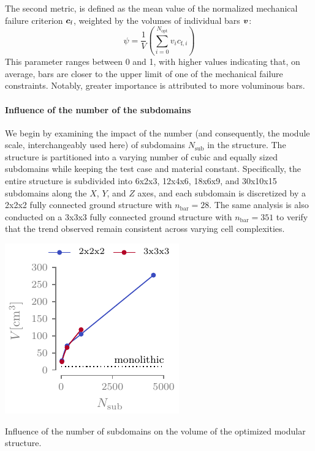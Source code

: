 The second metric, is defined as the mean value of the normalized mechanical failure criterion $\bm{c}_\text{f}$, weighted by the volumes of individual bars $\bm{v}$:
\begin{equation}
    \psi = \frac{1}{V} \left( \sum_{i=0}^{N_\text{opt}} v_i c_{\text{f},i} \right)
\end{equation}
This parameter ranges between 0 and 1, with higher values indicating that, on average, bars are closer to the upper limit of one of the mechanical failure constraints. Notably, greater importance is attributed to more voluminous bars.

\paragraph{Influence of the number of the subdomains}
We begin by examining the impact of the number (and consequently, the module scale, interchangeably used here) of subdomains $N_\text{sub}$ in the structure. The structure is partitioned into a varying number of cubic and equally sized subdomains while keeping the test case and material constant. Specifically, the entire structure is subdivided into 6x2x3, 12x4x6, 18x6x9, and 30x10x15 subdomains along the $X$, $Y$, and $Z$ axes, and each subdomain is discretized by a 2x2x2 fully connected ground structure with $n_{\text{bar}} = 28$. The same analysis is also conducted on a 3x3x3 fully connected ground structure with $n_{\text{bar}} = 351$ to verify that the trend observed remain consistent across varying cell complexities.

\begin{marginfigure}
    \centering
    \includegraphics{figures/05_cellular_opt/00_module_scale_tab/scale_tab_v.pdf}
    \caption{Influence of the number of subdomains on the volume of the optimized modular structure.}
    \label{fig:05_scale_v}
\end{marginfigure}

